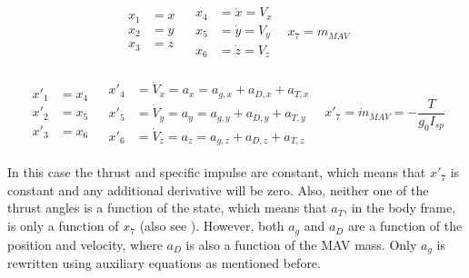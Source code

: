 \begin{align} \label{eq:stateX}
\begin{split} 
x_{1}&=x\\
x_{2}&=y\\
x_{3}&=z
\end{split} 
&
\begin{split}
x_{4}&=\dot{x}=V_{x}\\
x_{5}&=\dot{y}=V_{y}\\
x_{6}&=\dot{z}=V_{z}
\end{split}
&
x_{7}=m_{MAV}
\end{align}


\begin{align} \label{eq:state_derivativesX}
\begin{split} 
x'_{1}&=x_{4}\\
x'_{2}&=x_{5}\\
x'_{3}&=x_{6}
\end{split} 
&
\begin{split}
x'_{4}&=\dot{V}_{x}=a_{x}=a_{g,x}+a_{D,x}+a_{T,x}\\
x'_{5}&=\dot{V}_{y}=a_{y}=a_{g,y}+a_{D,y}+a_{T,y}\\
x'_{6}&=\dot{V}_{z}=a_{z}=a_{g,z}+a_{D,z}+a_{T,z}
\end{split}
&
x'_{7}=\dot{m}_{MAV}=-\dfrac{T}{g_{0}I_{sp}}
\end{align}


\noindent
In this case the thrust and specific impulse are constant, which means that $x'_{7}$ is constant and any additional derivative will be zero. Also, neither one of the thrust angles is a function of the state, which means that $a_{T}$, in the body frame, is only a function of $x_{7}$ (also see ). However, both $a_{g}$ and $a_{D}$ are a function of the position and velocity, where $a_{D}$ is also a function of the \ac{MAV} mass. Only $a_{g}$ is rewritten using auxiliary equations as mentioned before. 







